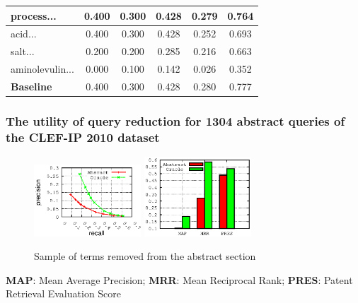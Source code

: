 \documentclass[xcolor=x11names,compress]{beamer}
\renewcommand{\(}{\begin{columns}}
\renewcommand{\)}{\end{columns}}
\newcommand{\<}[1]{\begin{column}{#1}}
\renewcommand{\>}{\end{column}}
\begin{document}
\begin{frame}
\begin{tiny}
\begin{table}
\begin{tabular}{|l|c|c|c|c|c|}
\hline 
{\scriptsize{}process...} & {\scriptsize{}0.400} & {\scriptsize{}0.300} & {\scriptsize{}0.428} & {\scriptsize{}0.279} & {\scriptsize{}0.764}\tabularnewline
\hline 
{\scriptsize{}acid...} & {\scriptsize{}0.400} & {\scriptsize{}0.300} & {\scriptsize{}0.428} & {\scriptsize{}0.252} & {\scriptsize{}0.693}\tabularnewline
\hline 
{\scriptsize{}salt...} & {\scriptsize{}0.200} & {\scriptsize{}0.200} & {\scriptsize{}0.285} & {\scriptsize{}0.216} & {\scriptsize{}0.663}\tabularnewline
\hline 
{\scriptsize{}aminolevulin...} & {\scriptsize{}0.000} & {\scriptsize{}0.100} & {\scriptsize{}0.142} & {\scriptsize{}0.026} & {\scriptsize{}0.352}\tabularnewline
\hline 
\hline 
\textbf{\scriptsize{}Baseline} & {\scriptsize{}0.400} & {\scriptsize{}0.300} & {\scriptsize{}0.428} & {\scriptsize{}0.280} & {\scriptsize{}0.777}\tabularnewline
\hline 
\end{tabular}
\end{table}
\end{tiny}
\end{frame}


\begin{frame}
\frametitle{The utility of query reduction for 1304 abstract queries of the CLEF-IP 2010 dataset}



\begin{figure}
\begin{center}
\includegraphics[width=4cm]{../analysis/precision-recall_ByField-CLEF-IP_2010}
\includegraphics[width=4cm]{../analysis/MAP-MRR_ByField-CLEF-IP_2010}
\caption{Sample of terms removed from the abstract section}
\end{center}
\end{figure}

\begin{tiny}
\textbf{MAP}: Mean Average Precision;  \textbf{MRR}: Mean Reciprocal Rank; \textbf{PRES}: Patent Retrieval Evaluation Score
\end{tiny}
\end{frame}
\end{document}
